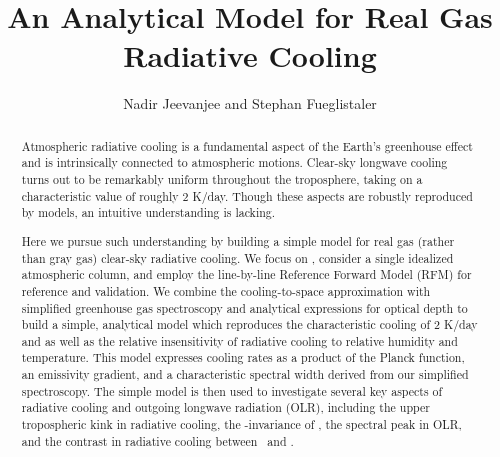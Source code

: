 \documentclass[10pt]{article}
\begin{document}
%
%


\title{An Analytical Model for Real Gas Radiative Cooling}

%
%


 \author{Nadir Jeevanjee and Stephan Fueglistaler}

\maketitle

\begin{abstract}
Atmospheric radiative cooling is a fundamental aspect of the Earth's greenhouse effect and is intrinsically connected to  atmospheric motions. Clear-sky longwave cooling turns out to be remarkably uniform throughout the troposphere, taking on a characteristic value of roughly 2 K/day. Though these aspects are robustly reproduced by models, an intuitive understanding is lacking.

Here we pursue such understanding by building a simple model for real gas (rather than gray gas) clear-sky  radiative cooling. We  focus on \htwo, consider  a single idealized atmospheric column, and employ the line-by-line Reference Forward Model (RFM) for reference and validation.  We  combine the cooling-to-space approximation with simplified greenhouse gas spectroscopy and analytical expressions for optical depth to build a simple, analytical model which reproduces the characteristic cooling  of 2 K/day and as well as the relative insensitivity of radiative cooling to relative humidity and temperature. This model expresses cooling rates as a product of the Planck function, an emissivity gradient, and a characteristic spectral width  derived from our simplified spectroscopy. The simple model is then used to investigate  several key aspects of radiative cooling and outgoing longwave radiation (OLR), including the upper tropospheric kink in radiative cooling, the \Ts-invariance of \cite{jeevanjee2018},  the spectral peak in OLR, and the contrast in radiative cooling between \htwo\ and \cotwo.




%
%
\end{abstract}
\end{document}
